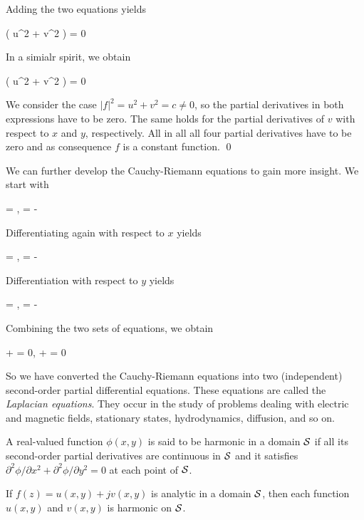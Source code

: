 Adding the two equations yields

\bee
( u^2 + v^2 ) = 0
\eee

In a simialr spirit, we obtain

\bee
( u^2 + v^2 ) = 0
\eee

We consider the case $|f|^2 = u^2 + v^2 = c \neq 0$, so the partial derivatives in both expressions have to be zero. The same holds for the partial derivatives of $v$ with respect to $x$ and $y$, respectively. All in all all four partial derivatives have to be zero and as consequence $f$ is a constant function. \qed

We can further develop the Cauchy-Riemann equations to gain more insight. We start with

\bee
{} = , \quad {} = - 
\eee

Differentiating again with respect to $x$ yields

\bee
{} = , \quad {} = - 
\eee

Differentiation with respect to $y$ yields

\bee
{} = , \quad {} = - 
\eee

Combining the two sets of equations, we obtain

\bee
{} +  = 0, \quad {} +  = 0
\eee

So we have converted the Cauchy-Riemann equations into two (independent) second-order partial differential equations. These equations are called the \emph{Laplacian equations}. They occur in the study of problems dealing with electric and magnetic fields, stationary states, hydrodynamics, diffusion, and so on.

A real-valued function $\phi(x, y)$ is said to be harmonic in a domain $\mathcal{S}$ if all its second-order partial derivatives are continuous in $\mathcal{S}$ and it satisfies $\partial^2 \phi / \partial x^2 + \partial^2 \phi / \partial y^2 = 0$ at each point of $\mathcal{S}$.

\begin{theorem}
    If $f(z) = u(x,y) + j v(x,y)$ is analytic in a domain $\mathcal{S}$, then each function $u(x,y)$ and $v(x,y)$ is harmonic on $\mathcal{S}$.
\end{theorem}


